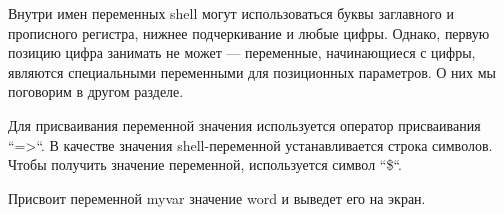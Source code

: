 Внутри имен переменных shell могут использоваться буквы заглавного и прописного регистра, нижнее подчеркивание и любые цифры. Однако, первую позицию цифра занимать не может --- переменные, начинающиеся с цифры, являются специальными переменными для позиционных параметров. О них мы поговорим в другом разделе.

Для присваивания переменной значения используется оператор присваивания “=>“. В качестве значения shell-переменной устанавливается строка символов. Чтобы получить значение переменной, используется символ “\$“.

		
Присвоит переменной myvar значение word и выведет его на экран.

